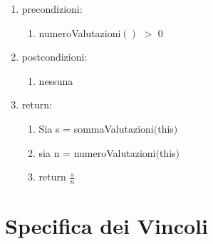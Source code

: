 \documentclass{article}
\begin{document}
\begin{enumerate}
\begin{enumerate}
        \begin{enumerate}
            \item precondizioni:
            \begin{enumerate}
                \item numeroValutazioni$()$ $>$ 0
            \end{enumerate}
            \item postcondizioni:
            \begin{enumerate}
                \item nessuna
            \end{enumerate}
            \item return:
            \begin{enumerate}
                \item Sia s = sommaValutazioni$($this$)$
                \item sia n = numeroValutazioni$($this$)$
                \item return $\frac{s}{n}$
            \end{enumerate}
        \end{enumerate}
    \end{enumerate}
\end{enumerate}

\newpage

\section{\label{sec:Vincoli}Specifica dei Vincoli}
\end{document}
